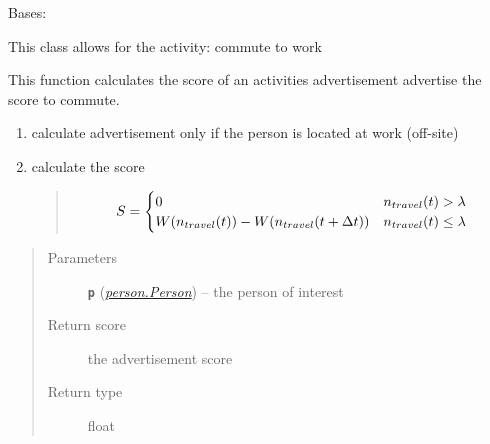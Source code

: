 \documentclass[letterpaper,10pt,english]{sphinxmanual}
\begin{document}

\begin{fulllineitems}
\label{commute:commute.Commute_To_Work}
Bases: {\hyperref[commute:commute.Commute]{\emph{}}}

This class allows for the activity: commute to work

\begin{fulllineitems}
\label{commute:commute.Commute_To_Work.advertise}
This function calculates the score of an activities advertisement         advertise the score to commute.
\begin{enumerate}
\item {} 
calculate advertisement only if the person is located at work (off-site)

\item {} 
calculate the score
\begin{quote}
\begin{gather}
\begin{split}S = \begin{cases}
0  & n_{travel}(t) > \lambda \\
W( n_{travel}(t) ) - W( n_{travel}(t + \Delta{t} )) & n_{travel}(t) \le \lambda
\end{cases}\end{split}\notag
\end{gather}\end{quote}

\end{enumerate}
\begin{quote}\begin{description}
\item[{Parameters}] \leavevmode
\textbf{\texttt{p}} ({\hyperref[person:person.Person]{\emph{\emph{person.Person}}}}) -- the person of interest

\item[{Return score}] \leavevmode
the advertisement score

\item[{Return type}] \leavevmode
float

\end{description}\end{quote}

\end{fulllineitems}


\end{fulllineitems}
\end{document}
